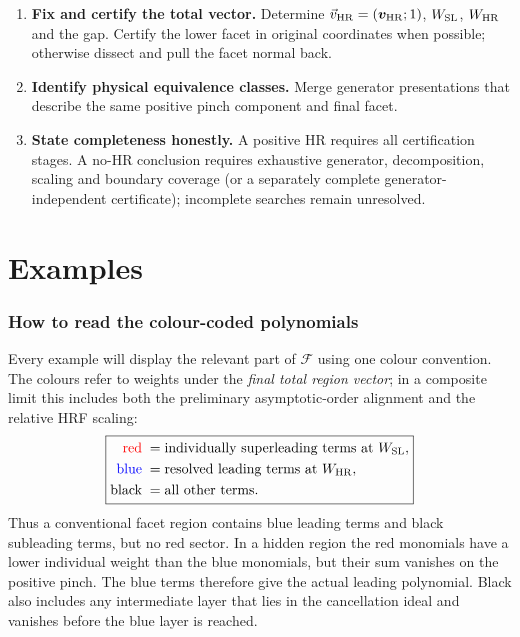 \documentclass[a4paper,11pt]{article}
\newcommand{\HR}{\mathrm{HR}}
\newcommand{\WSL}{W_{\rm SL}}
\newcommand{\WHR}{W_{\rm HR}}
\newcommand{\vHR}{\vec v_{\rm HR}}
\newcommand{\SLcolour}[1]{{\color{red}#1}}
\newcommand{\HRcolour}[1]{{\color{blue}#1}}
\newcommand{\Othercolour}[1]{{\color{black}#1}}
\begin{document}
\begin{enumerate}[label=\textbf{\arabic*.},leftmargin=*]
      Use the ideal filtration of the complete
      \(\mathcal P=\mathcal U+\mathcal F\), positive transverse weights and
      the actual \(\delta\)-weight lattice to find the first nonvanishing
      layer.
\item \textbf{Fix and certify the total vector.}
      Determine \(\vHR=(\boldsymbol v_{\HR};1)\), \(\WSL\), \(\WHR\) and the
      gap.  Certify the lower facet in original coordinates when possible;
      otherwise dissect and pull the facet normal back.
\item \textbf{Identify physical equivalence classes.}
      Merge generator presentations that describe the same positive pinch
      component and final facet.
\item \textbf{State completeness honestly.}
      A positive HR requires all certification stages.  A no-HR conclusion
      requires exhaustive generator, decomposition, scaling and boundary
      coverage (or a separately complete generator-independent certificate);
      incomplete searches remain unresolved.
\end{enumerate}

\part{Examples}

\section{How to read the colour-coded polynomials}
\label{sec:example-colours}

Every example will display the relevant part of \(\mathcal F\) using one
colour convention.  The colours refer to weights under the \emph{final total
region vector}; in a composite limit this includes both the preliminary
asymptotic-order alignment and the relative HRF scaling:
\begin{equation}
 \boxed{\begin{aligned}
 \SLcolour{\text{red}}\;&=\text{individually superleading terms at }\WSL,\\
 \HRcolour{\text{blue}}\;&=\text{resolved leading terms at }\WHR,\\
 \Othercolour{\text{black}}\;&=\text{all other terms}.
 \end{aligned}}
\label{eq:colour-key}
\end{equation}
Thus a conventional facet region contains blue leading terms and black
subleading terms, but no red sector.  In a hidden region the red monomials
have a lower individual weight than the blue monomials, but their sum
vanishes on the positive pinch.  The blue terms therefore give the actual
leading polynomial.  Black also includes any intermediate layer that lies
in the cancellation ideal and vanishes before the blue layer is reached.
\end{document}
